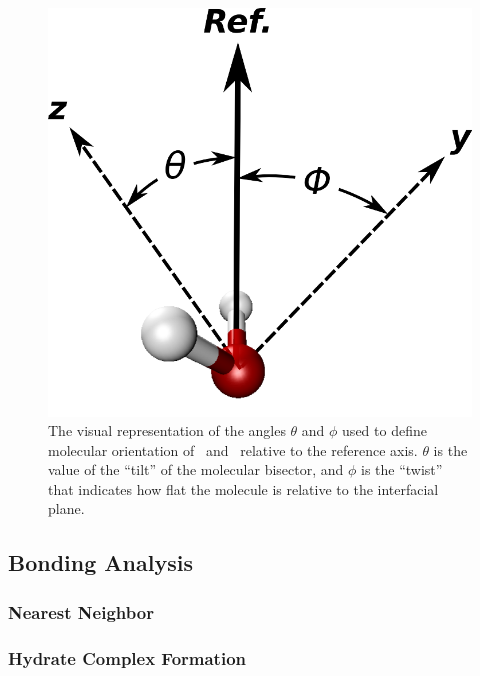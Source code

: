 \begin{figure}[h!]
	\begin{center}
		\includegraphics[scale=1.0]{images/wateranglessmall.png}
		\caption{The visual representation of the angles $\theta$ and $\phi$ used to define molecular orientation of \suldiox~and \wat~relative to the reference axis. $\theta$ is the value of the ``tilt'' of the molecular bisector, and $\phi$ is the ``twist'' that indicates how flat the molecule is relative to the interfacial plane.}
		\label{fig:water-angles}
	\end{center}
\end{figure}

\subsection{Bonding Analysis}
\subsubsection{Nearest Neighbor}
\subsubsection{Hydrate Complex Formation}
